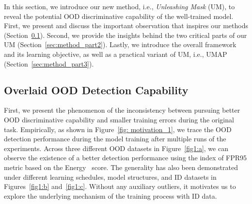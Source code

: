 \documentclass{article}
\theoremstyle{plain}
\theoremstyle{definition}
\theoremstyle{remark}
\begin{document}
In this section, we introduce our new method, i.e., \textit{Unleashing Mask} (UM), to reveal the potential OOD discriminative capability of the well-trained model. First, we present and discuss the important observation that inspires our methods (Section~\ref{sec:method_part1}). Second, we provide the insights behind the two critical parts of our UM (Section~\ref{sec:method_part2}). Lastly, we introduce the overall framework and its learning objective, as well as a practical variant of UM, i.e., UMAP (Section~\ref{sec:method_part3}). 

\subsection{Overlaid OOD Detection Capability}
\label{sec:method_part1}

First, we present the phenomenon of the inconsistency between pursuing better OOD discriminative capability and smaller training errors during the original task. 
Empirically, as shown in Figure~\ref{fig: motivation_1}, we trace the OOD detection performance during the model training after multiple runs of the experiments. Across three different OOD datasets in Figure~\ref{fig1:a}, we can observe the existence of a better detection performance using the index of FPR95 metric based on the Energy~\citep{liu2020energy} score. The generality has also been demonstrated under different learning schedules, model structures, and ID datasets in Figures~\ref{fig1:b} and~\ref{fig1:c}. Without any auxiliary outliers, it motivates us to explore the underlying mechanism of the training process with ID data.
\end{document}
